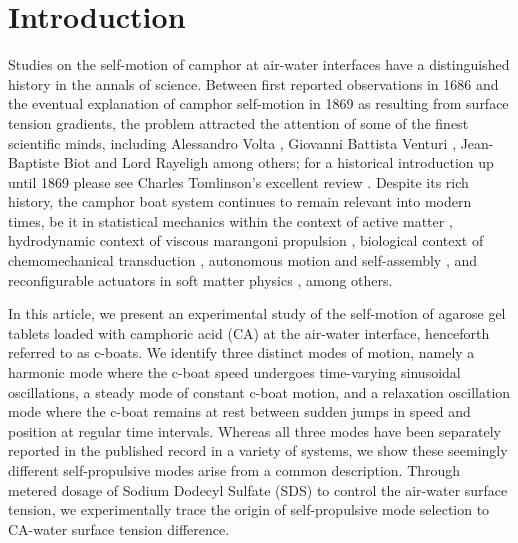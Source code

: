 \documentclass[journal=langd5, manuscript=article, layout=twocolumn]{achemso}
\begin{document}
\section{Introduction}
\label{introsec}
Studies on the self-motion of camphor at air-water interfaces have a distinguished history in the annals of science. Between first reported observations in 1686 \cite{Heyde1686} and the eventual explanation of camphor self-motion in 1869 \cite{Mensbrugghe1869} as resulting from surface tension gradients, the problem attracted the attention of some of the finest scientific minds, including Alessandro Volta \cite{Volta1787}, Giovanni Battista Venturi \cite{Venturi1797}, Jean-Baptiste Biot \cite{Biot1801} and Lord Rayeligh \cite{Rayleigh1889} among others; for a historical introduction up until 1869 please see Charles Tomlinson's excellent review \cite{Tomlinson1869}. Despite its rich history, the camphor boat system continues to remain relevant into modern times, be it in statistical mechanics within the context of active matter \cite{Ramaswamy2010}, hydrodynamic context of viscous marangoni propulsion \cite{Lauga2012}, biological context of chemomechanical transduction \cite{Nakata1997}, autonomous motion and self-assembly \cite{Ismagilov2002}, and reconfigurable actuators in soft matter physics \cite{Geryak2014}, among others.

In this article, we present an experimental study of the self-motion of agarose gel tablets loaded with camphoric acid (CA) at the air-water interface, henceforth referred to as c-boats. We identify three distinct modes of motion, namely a harmonic mode where the c-boat speed undergoes time-varying sinusoidal oscillations, a steady mode of constant c-boat motion, and a relaxation oscillation mode where the c-boat remains at rest between sudden jumps in speed and position at regular time intervals. Whereas all three modes have been separately reported in the published record \cite{Hayashima2001, Suematsu2010, Jin2012, Velev2012} in a variety of systems, we show these seemingly different self-propulsive modes arise from a common description. Through metered dosage of Sodium Dodecyl Sulfate (SDS) to control the air-water surface tension, we experimentally trace the origin of self-propulsive mode selection to CA-water surface tension difference.
\end{document}
